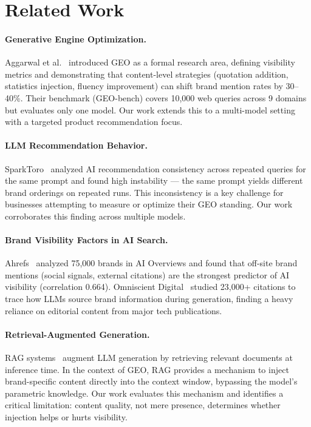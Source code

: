\documentclass{article}
\begin{document}
\section{Related Work}

\paragraph{Generative Engine Optimization.}
Aggarwal et al.~\cite{aggarwal2024geo} introduced GEO as a formal research area, defining visibility metrics and demonstrating that content-level strategies (quotation addition, statistics injection, fluency improvement) can shift brand mention rates by 30–40\%. Their benchmark (GEO-bench) covers 10,000 web queries across 9 domains but evaluates only one model. Our work extends this to a multi-model setting with a targeted product recommendation focus.

\paragraph{LLM Recommendation Behavior.}
SparkToro~\cite{sparktoro2025} analyzed AI recommendation consistency across repeated queries for the same prompt and found high instability — the same prompt yields different brand orderings on repeated runs. This inconsistency is a key challenge for businesses attempting to measure or optimize their GEO standing. Our work corroborates this finding across multiple models.

\paragraph{Brand Visibility Factors in AI Search.}
Ahrefs~\cite{ahrefs2025} analyzed 75,000 brands in AI Overviews and found that off-site brand mentions (social signals, external citations) are the strongest predictor of AI visibility (correlation 0.664). Omniscient Digital~\cite{omniscient2025} studied 23,000+ citations to trace how LLMs source brand information during generation, finding a heavy reliance on editorial content from major tech publications.

\paragraph{Retrieval-Augmented Generation.}
RAG systems~\cite{lewis2020rag} augment LLM generation by retrieving relevant documents at inference time. In the context of GEO, RAG provides a mechanism to inject brand-specific content directly into the context window, bypassing the model's parametric knowledge. Our work evaluates this mechanism and identifies a critical limitation: content quality, not mere presence, determines whether injection helps or hurts visibility.
\end{document}
